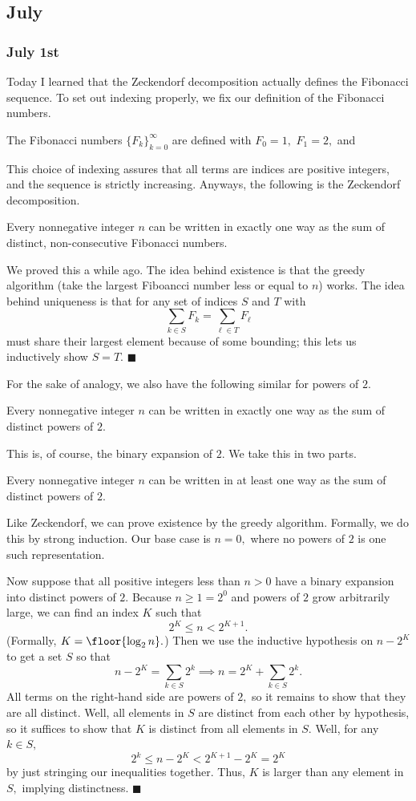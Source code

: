 \subsection{July}

\subsubsection{July 1st}
Today I learned that the Zeckendorf decomposition actually defines the Fibonacci sequence. To set out indexing properly, we fix our definition of the Fibonacci numbers.
\begin{definition}
    The Fibonacci numbers $\{F_k\}_{k=0}^\infty$ are defined with $F_0=1,$ $F_1=2,$ and
\end{definition}
This choice of indexing assures that all terms are indices are positive integers, and the sequence is strictly increasing. Anyways, the following is the Zeckendorf decomposition.
\begin{theorem}
    Every nonnegative integer $n$ can be written in exactly one way as the sum of distinct, non-consecutive Fibonacci numbers.
\end{theorem}
We proved this a while ago. The idea behind existence is that the greedy algorithm (take the largest Fiboancci number less or equal to $n$) works. The idea behind uniqueness is that for any set of indices $S$ and $T$ with
\[\sum_{k\in S}F_k=\sum_{\ell\in T}F_\ell\]
must share their largest element because of some bounding; this lets us inductively show $S=T.$ $\blacksquare$

For the sake of analogy, we also have the following similar for powers of $2.$
\begin{proposition}
    Every nonnegative integer $n$ can be written in exactly one way as the sum of distinct powers of $2.$
\end{proposition}
This is, of course, the binary expansion of $2.$ We take this in two parts.
\begin{lemma}
    Every nonnegative integer $n$ can be written in at least one way as the sum of distinct powers of $2.$
\end{lemma}
Like Zeckendorf, we can prove existence by the greedy algorithm. Formally, we do this by strong induction. Our base case is $n=0,$ where no powers of $2$ is one such representation.

Now suppose that all positive integers less than $n>0$ have a binary expansion into distinct powers of $2.$ Because $n\ge1=2^0$ and powers of $2$ grow arbitrarily large, we can find an index $K$ such that
\[2^K\le n<2^{K+1}.\]
(Formally, $K=\floor{\log_2n}.$) Then we use the inductive hypothesis on $n-2^K$ to get a set $S$ so that
\[n-2^K=\sum_{k\in S}2^k\implies n=2^K+\sum_{k\in S}2^k.\]
All terms on the right-hand side are powers of $2,$ so it remains to show that they are all distinct. Well, all elements in $S$ are distinct from each other by hypothesis, so it suffices to show that $K$ is distinct from all elements in $S.$ Well, for any $k\in S,$
\[2^k\le n-2^K<2^{K+1}-2^K=2^K\]
by just stringing our inequalities together. Thus, $K$ is larger than any element in $S,$ implying distinctness. $\blacksquare$

